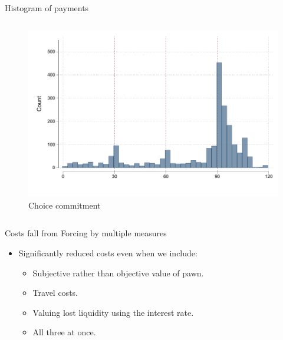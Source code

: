\documentclass[8pt]{beamer}
\begin{document}
\begin{frame}{Histogram of payments}
\begin{columns}
\begin{column}{.33\textwidth}
    \begin{figure}[H]
    \caption{Choice commitment}
    \begin{center}
        \includegraphics[width=\textwidth]{Figuras/hist_payments_cc.pdf}
    \end{center}
\end{figure}
\end{column}
\end{columns}


    
    \hyperlink{treatment_arms}{}
\end{frame}





\begin{frame}{Costs fall from Forcing by multiple measures}
\label{several_def_cost}
\begin{table}[H]
\caption{Effects on several definitions of cost}
\label{table_robustness_fc}
\begin{center}
\resizebox{0.95\textwidth}{!}{
\small{}
}
\end{center}
 \scriptsize 
 
\end{table}
 \begin{itemize}
     \item \vfill Significantly reduced costs even when we include:
     \begin{itemize}
         \item Subjective rather than objective value of pawn.
         \item Travel costs.
         \item Valuing lost liquidity using the interest rate.
         \item All three at once.
     \end{itemize}
\end{itemize}
\end{frame}
\end{document}
